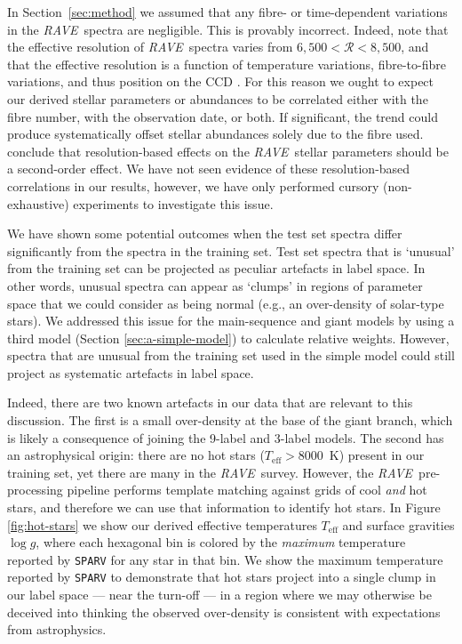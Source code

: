 \documentclass[preprint]{aastex}
\newcommand{\acronym}[1]{{\small{#1}}}
\newcommand{\project}[1]{\textsl{#1}}
\newcommand{\rave}{\project{\acronym{RAVE}}}
\newcommand{\teff}{T_{\mathrm{eff}}}
\newcommand{\logg}{\log g}
\begin{document}
In Section~\ref{sec:method} we assumed that any fibre- or time-dependent variations
in the \rave\ spectra are negligible.  This is provably incorrect. Indeed,
\citet{Kordopatis_2013} note that the effective resolution of \rave\ spectra
varies from $6{,}500 < \mathcal{R} < 8{,}500$, and that the effective 
resolution is a function of temperature variations, fibre-to-fibre variations,
and thus position on the CCD \citep{Steinmetz_2006}. For this reason we ought
to expect our derived stellar parameters or abundances to be correlated either
with the fibre number, with the observation date, or both.  If significant, 
the trend could produce systematically offset stellar abundances solely due to
the fibre used.  \citet{Kordopatis_2013} conclude that resolution-based effects 
on the \rave\ stellar parameters should be a second-order effect. We have not 
seen evidence of these resolution-based correlations in our results, however, 
we have only performed cursory (non-exhaustive) experiments to investigate 
this issue.


We have shown some potential outcomes when the test set spectra differ 
significantly from the spectra in the training set.  Test set spectra that is
`unusual' from the training set can be projected as peculiar artefacts in 
label space.  In other words, unusual spectra can appear as `clumps' in
regions of parameter space that we could consider as being normal (e.g.,
an over-density of solar-type stars).  We addressed this issue for the main-sequence
and giant models by using a third model (Section \ref{sec:a-simple-model}) to
calculate relative weights.  However, spectra that are unusual from the 
training set used in the simple model could still project as systematic 
artefacts in label space.  


Indeed, there are two known artefacts in our data that are relevant to this 
discussion. The first is a small over-density at the base of the giant branch, 
which is likely a consequence of joining the 9-label and 3-label models.  The
second has an astrophysical origin: there are no hot stars ($\teff > 8000$~K)
present in our training set, yet there are many in the \rave\ survey.
However, the \rave\ pre-processing pipeline 
\citep[\texttt{SPARV};][]{Steinmetz_2006,Zwitter_2008} performs template 
matching against grids of cool \emph{and} hot stars, and therefore we can use 
that information to identify hot stars.  In Figure \ref{fig:hot-stars} 
we show our derived effective temperatures $\teff$ and surface gravities $\logg$,
where each hexagonal bin is colored by the \emph{maximum} temperature
reported by \texttt{SPARV} for any star in that bin.  We show the maximum
temperature reported by \texttt{SPARV} to demonstrate that hot stars project
into a single clump in our label space --- near the turn-off --- in a region
where we may otherwise be deceived into thinking the observed over-density
is consistent with expectations from astrophysics.  
\end{document}
